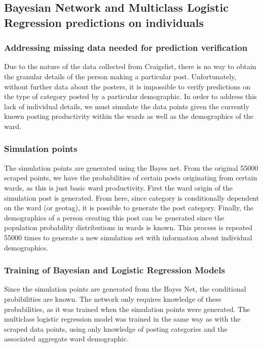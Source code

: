 \documentclass[12pt]{article}
\begin{document}
\subsection{Bayesian Network and Multiclass Logistic Regression predictions on individuals}

\subsubsection{Addressing missing data needed for prediction verification}
Due to the nature of the data collected from Craigslist, there is no way to obtain the granular details of the person making a particular post. Unfortunately, without further data about the posters, it is impossible to verify predictions on the type of category posted by a particular demographic. In order to address this lack of individual details, we must simulate the data points given the currently known posting productivity within the wards as well as the demographics of the ward. 

\subsubsection{Simulation points}
The simulation points are generated using the Bayes net. From the original 55000 scraped points, we have the probabilities of certain posts originating from certain wards, as this is just basic ward productivity. First the ward origin of the simulation post is generated. From here, since category is conditionally dependent on the ward (or geotag), it is possible to generate the post category. Finally, the demographics of a person creating this post can be generated since the population probability distributions in wards is known. This process is repeated 55000 times to generate a new simulation set with information about individual demographics.

\subsubsection{Training of Bayesian and Logistic Regression Models}
Since the simulation points are generated from the Bayes Net, the conditional probibilities are known. The network only requires knowledge of these probabilities, as it was trained when the simulation points were generated. The multiclass logistic regression model was trained in the same way as with the scraped data points, using only knowledge of posting categories and the associated aggregate ward demographic. 
\end{document}
